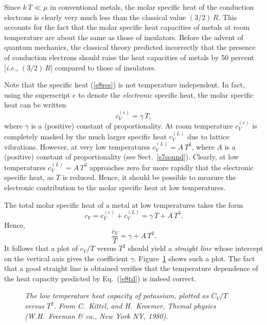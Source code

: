 Since $k\,T\ll \mu$ in conventional metals, the molar specific heat of
the conduction electrons is clearly very much less than the classical value
$(3/2)\,R$. This accounts for the fact that
the molar specific heat capacities of metals at room temperature are
about the same as those of insulators. Before the advent of
quantum mechanics, the classical theory predicted incorrectly that the
presence of conduction electrons should raise the heat capacities of
metals by 50 percent [{\em i.e.}, $(3/2)\,R$] compared to those of insulators.

Note that the specific heat (\ref{e8res}) is not temperature independent.
In fact, using the superscript $e$ to denote the {\em electronic}
specific heat, the molar specific heat can be written
\begin{equation}
c_V^{(e)} = \gamma\,T,
\end{equation}
where $\gamma$ is a (positive) constant of proportionality.
At room temperature $c_V^{(e)}$ is completely masked by the much
larger specific heat $c_V^{(L)}$ due to lattice vibrations. However, at
very low temperatures $c_V^{(L)}=A\,T^3$, where $A$ is a (positive)
constant of proportionality (see Sect.~\ref{s7sound}). Clearly, 
at low temperatures $c_V^{(L)}=A\,T^3$ approaches zero far more rapidly that
the electronic specific heat, as $T$ is reduced. Hence, it should be possible
to measure the electronic contribution to the molar specific
heat at low temperatures. 

The total molar specific heat of a metal at low temperatures takes the
form
\begin{equation}
c_V = c_V^{(e)} + c_V^{(L)} = \gamma\,T + A\,T^3.\label{e8td}
\end{equation}
Hence,
\begin{equation}
\frac{c_V}{T} = \gamma + A\,T^2.
\end{equation}
It follows that a plot of $c_V/T$ versus $T^2$ should yield a
{\em straight line}\/ whose intercept on the vertical axis gives the
coefficient $\gamma$. Figure~\ref{fkcv} shows such a plot.
The fact that a good straight line is obtained verifies that the temperature
dependence of the heat capacity predicted by Eq.~(\ref{e8td}) is  indeed
correct.

\begin{figure}
\epsfysize=2in
\centerline{}
\caption{\em The low temperature heat capacity of potassium, plotted as $C_V/T$ versus
$T^2$. From C.~Kittel, and H.~Kroemer, Themal physics (W.H.~Freeman \& co., New York NY, 1980).}\label{fkcv}
\end{figure}

